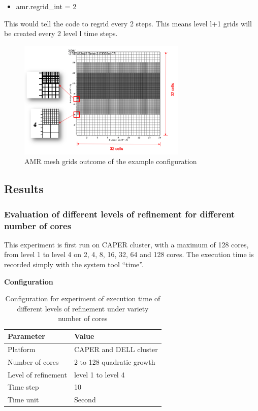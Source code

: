 \documentclass[10pt, conference, compsocconf]{IEEEtran}
\begin{document}
\begin{itemize}
\item amr.regrid\_int = 2
\end{itemize}
This would tell the code to regrid every 2 steps. This means level l+1 grids will be created every 2 level l time steps.


\begin{figure}[H]
	\centering
    \includegraphics[width=8cm]{figs/AMR_resolution_explaination.png}
        \caption{AMR mesh grids outcome of the example configuration}
        \label{fig:AMR_resolution_explaination}
\end{figure}


\subsection{Results}
\subsubsection{Evaluation of different levels of refinement for different number of cores}
This experiment is first run on CAPER cluster, with a maximum of 128 cores, from level 1 to level 4 on 2, 4, 8, 16, 32, 64 and 128 cores. The execution time is recorded simply with the system tool ``time''.

\noindent
\textbf{Configuration}
\begin{table}[H]
\begin{center}
\begin{tabular}{|l|l|}
	\hline
	\textbf{Parameter} & \textbf{Value}\\ \hline
    Platform & CAPER and DELL cluster\\ 		\hline
    Number of cores & 2 to 128 quadratic growth\\
	\hline
    Level of refinement  & level 1 to level 4\\
    \hline
    Time step & 10\\
    \hline
    Time unit & Second\\
    \hline
\end{tabular}
\end{center}
\caption{Configuration for experiment of execution time of different levels of refinement under variety number of cores
}
\label{table:table_time_refinement}
\end{table}
\end{document}
